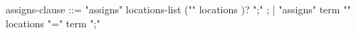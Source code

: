 \begin{syntax}
{ assigns-clause } ::= { "assigns" locations-list ("\from" locations )? ";" } ;
                 | { "assigns" term "\from" locations "=" term ";" }
\end{syntax}
